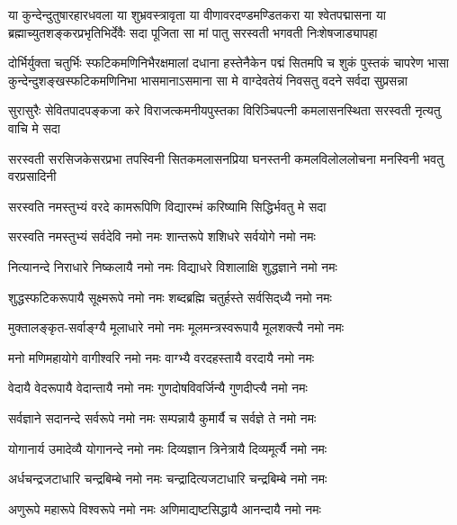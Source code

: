 

\fourlineindentedshloka
{या कुन्देन्दुतुषारहारधवला या शुभ्रवस्त्रावृता}
{या वीणावरदण्डमण्डितकरा या श्वेतपद्मासना}
{या ब्रह्माच्युतशङ्करप्रभृतिभिर्देवैः सदा पूजिता}
{सा मां पातु सरस्वती भगवती निःशेषजाड्यापहा}

\fourlineindentedshloka
{दोर्भिर्युक्ता चतुर्भिः स्फटिकमणिनिभैरक्षमालां दधाना}
{हस्तेनैकेन पद्मं सितमपि च शुकं पुस्तकं चापरेण}
{भासा कुन्देन्दुशङ्खस्फटिकमणिनिभा भासमानाऽसमाना}
{सा मे वाग्देवतेयं निवसतु वदने सर्वदा सुप्रसन्ना}

\fourlineindentedshloka
{सुरासुरैः सेवितपादपङ्कजा}
{करे विराजत्कमनीयपुस्तका}
{विरिञ्चिपत्नी कमलासनस्थिता}
{सरस्वती नृत्यतु वाचि मे सदा}

\fourlineindentedshloka
{सरस्वती सरसिजकेसरप्रभा}
{तपस्विनी सितकमलासनप्रिया}
{घनस्तनी कमलविलोललोचना}
{मनस्विनी भवतु वरप्रसादिनी}

\twolineshloka
{सरस्वति नमस्तुभ्यं वरदे कामरूपिणि}
{विद्यारम्भं करिष्यामि सिद्धिर्भवतु मे सदा}

\twolineshloka
{सरस्वति नमस्तुभ्यं सर्वदेवि नमो नमः}
{शान्तरूपे शशिधरे सर्वयोगे नमो नमः}

\twolineshloka
{नित्यानन्दे निराधारे निष्कलायै नमो नमः}
{विद्याधरे विशालाक्षि शुद्धज्ञाने नमो नमः}

\twolineshloka
{शुद्धस्फटिकरूपायै सूक्ष्मरूपे नमो नमः}
{शब्दब्रह्मि चतुर्हस्ते सर्वसिद्‌ध्यै नमो नमः}

\twolineshloka
{मुक्तालङ्कृत-सर्वाङ्ग्यै मूलाधारे नमो नमः}
{मूलमन्त्रस्वरूपायै मूलशक्त्यै नमो नमः}

\twolineshloka
{मनो मणिमहायोगे वागीश्वरि नमो नमः}
{वाग्भ्यै वरदहस्तायै वरदायै नमो नमः}

\twolineshloka
{वेदायै वेदरूपायै वेदान्तायै नमो नमः}
{गुणदोषविवर्जिन्यै गुणदीप्त्यै नमो नमः}

\twolineshloka
{सर्वज्ञाने सदानन्दे सर्वरूपे नमो नमः}
{सम्पन्नायै कुमार्यै च सर्वज्ञे ते नमो नमः}

\twolineshloka
{योगानार्य उमादेव्यै योगानन्दे नमो नमः}
{दिव्यज्ञान त्रिनेत्रायै दिव्यमूर्त्यै नमो नमः}

\twolineshloka
{अर्धचन्द्रजटाधारि चन्द्रबिम्बे नमो नमः}
{चन्द्रादित्यजटाधारि चन्द्रबिम्बे नमो नमः}

\twolineshloka
{अणुरूपे महारूपे विश्वरूपे नमो नमः}
{अणिमाद्यष्टसिद्धायै आनन्दायै नमो नमः}

